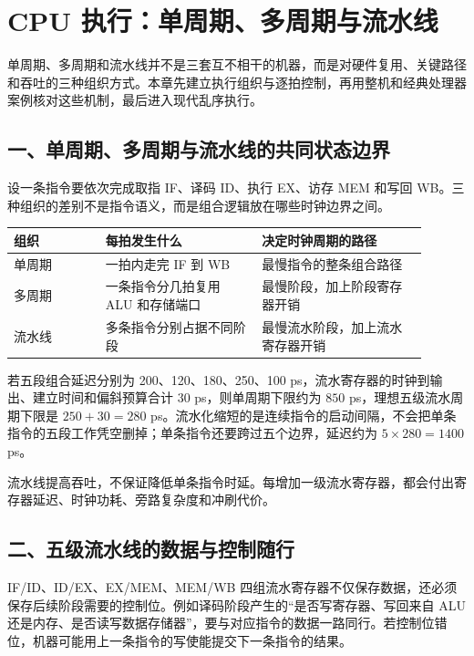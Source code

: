 \chapter{CPU 执行：单周期、多周期与流水线}

\begin{keyidea}
单周期、多周期和流水线并不是三套互不相干的机器，而是对硬件复用、关键路径和吞吐的三种组织方式。本章先建立执行组织与逐拍控制，再用整机和经典处理器案例核对这些机制，最后进入现代乱序执行。
\end{keyidea}

\section{一、单周期、多周期与流水线的共同状态边界}

设一条指令要依次完成取指 IF、译码 ID、执行 EX、访存 MEM 和写回 WB。三种组织的差别不是指令语义，而是组合逻辑放在哪些时钟边界之间。

\begin{longtable}{L{0.2\linewidth}L{0.34\linewidth}L{0.36\linewidth}}
\toprule
组织 & 每拍发生什么 & 决定时钟周期的路径 \\
\midrule
单周期 & 一拍内走完 IF 到 WB & 最慢指令的整条组合路径 \\\tablerowrule
多周期 & 一条指令分几拍复用 ALU 和存储端口 & 最慢阶段，加上阶段寄存器开销 \\\tablerowrule
流水线 & 多条指令分别占据不同阶段 & 最慢流水阶段，加上流水寄存器开销 \\
\bottomrule
\end{longtable}

若五段组合延迟分别为 200、120、180、250、100 ps，流水寄存器的时钟到输出、建立时间和偏斜预算合计 30 ps，则单周期下限约为 $850$ ps，理想五级流水周期下限是 $250+30=280$ ps。流水化缩短的是连续指令的启动间隔，不会把单条指令的五段工作凭空删掉；单条指令还要跨过五个边界，延迟约为 $5\times280=1400$ ps。

\begin{keyidea}
流水线提高吞吐，不保证降低单条指令时延。每增加一级流水寄存器，都会付出寄存器延迟、时钟功耗、旁路复杂度和冲刷代价。
\end{keyidea}

\section{二、五级流水线的数据与控制随行}

IF/ID、ID/EX、EX/MEM、MEM/WB 四组流水寄存器不仅保存数据，还必须保存后续阶段需要的控制位。例如译码阶段产生的“是否写寄存器、写回来自 ALU 还是内存、是否读写数据存储器”，要与对应指令的数据一路同行。若控制位错位，机器可能用上一条指令的写使能提交下一条指令的结果。

